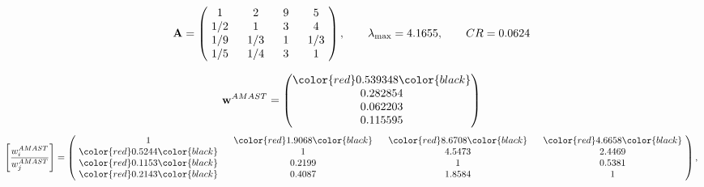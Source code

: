 \begin{example}
\begin{equation*}
\mathbf{A} =
\begin{pmatrix}
$\,\,$ 1 $\,\,$ & $\,\,$2$\,\,$ & $\,\,$9$\,\,$ & $\,\,$5 $\,\,$ \\
$\,\,$ 1/2$\,\,$ & $\,\,$ 1 $\,\,$ & $\,\,$3$\,\,$ & $\,\,$4 $\,\,$ \\
$\,\,$ 1/9$\,\,$ & $\,\,$ 1/3$\,\,$ & $\,\,$ 1 $\,\,$ & $\,\,$ 1/3 $\,\,$ \\
$\,\,$ 1/5$\,\,$ & $\,\,$ 1/4$\,\,$ & $\,\,$3$\,\,$ & $\,\,$ 1  $\,\,$ \\
\end{pmatrix},
\qquad
\lambda_{\max} =
4.1655,
\qquad
CR = 0.0624
\end{equation*}

\begin{equation*}
\mathbf{w}^{AMAST} =
\begin{pmatrix}
\color{red} 0.539348\color{black} \\
0.282854\\
0.062203\\
0.115595
\end{pmatrix}\end{equation*}
\begin{equation*}
\left[ \frac{{w}^{AMAST}_i}{{w}^{AMAST}_j} \right] =
\begin{pmatrix}
$\,\,$ 1 $\,\,$ & $\,\,$\color{red} 1.9068\color{black} $\,\,$ & $\,\,$\color{red} 8.6708\color{black} $\,\,$ & $\,\,$\color{red} 4.6658\color{black} $\,\,$ \\
$\,\,$\color{red} 0.5244\color{black} $\,\,$ & $\,\,$ 1 $\,\,$ & $\,\,$4.5473$\,\,$ & $\,\,$2.4469  $\,\,$ \\
$\,\,$\color{red} 0.1153\color{black} $\,\,$ & $\,\,$0.2199$\,\,$ & $\,\,$ 1 $\,\,$ & $\,\,$0.5381 $\,\,$ \\
$\,\,$\color{red} 0.2143\color{black} $\,\,$ & $\,\,$0.4087$\,\,$ & $\,\,$1.8584$\,\,$ & $\,\,$ 1  $\,\,$ \\
\end{pmatrix},
\end{equation*}


\end{example}
